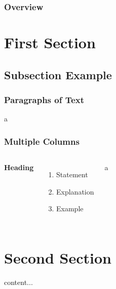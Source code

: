 \documentclass{beamer}
\begin{document}
\begin{frame}
\titlepage
\end{frame}
\begin{frame}
\frametitle{Overview}
\tableofcontents
\end{frame}
\section{First Section}
\subsection{Subsection Example}
\begin{frame}
\frametitle{Paragraphs of Text}
a
\end{frame}
\begin{frame}
  \frametitle{Multiple Columns}
  \begin{columns}[c]
    \textbf{Heading}
    \begin{enumerate}
      \item Statement
      \item Explanation
      \item Example
    \end{enumerate}

    a
  \end{columns}
\end{frame}
\section{Second Section}
\begin{frame}
content...
\end{frame}
\end{document}
